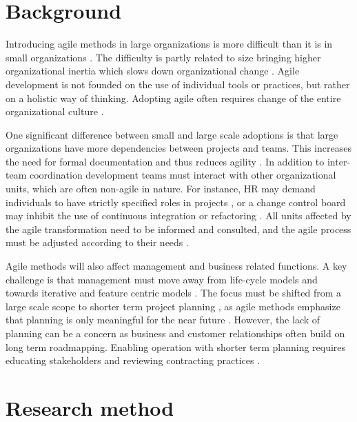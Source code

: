 \documentclass[lnbip]{svmultln}
\begin{document}
\section{Background}
\label{sec:background}

Introducing agile methods in large organizations is more difficult than it is in
small organizations . The difficulty is partly related to size
bringing higher organizational inertia which slows down organizational change
. Agile development is not founded on the use of individual
tools or practices, but rather on a holistic way of thinking.
Adopting agile often requires change of the entire organizational culture
.

One significant difference between small and large scale adoptions is that large
organizations have more dependencies between projects and teams. This increases
the need for formal documentation and thus reduces agility .
In addition to inter-team coordination development teams must
interact with other organizational units, which are often non-agile in
nature. For instance, HR may demand individuals to have strictly specified roles
in projects , or a change control board may inhibit the use of
continuous integration or refactoring . All units affected
by the agile transformation need to be informed and consulted, and the agile
process must be adjusted according to their needs .

Agile methods will also affect management and business related functions. A key
challenge is that management must move away from life-cycle models and towards
iterative and feature centric models . The focus must be
shifted from a large scale scope to shorter term project planning
, as agile methods emphasize that planning is only meaningful
for the near future . However, the lack of planning can be a
concern as business and customer relationships often build on long term
roadmapping. Enabling operation with shorter term planning requires educating
stakeholders and reviewing contracting practices .


\section{Research method}
\label{sec:method}
\end{document}
